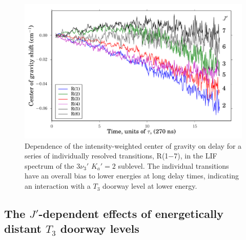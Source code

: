 \documentclass[12pt]{mitthesis}
\begin{document}
\begin{figure}
  \caption{Dependence of the intensity-weighted center of gravity on
    delay for a series of individually resolved transitions, R(1$-$7),
    in the LIF spectrum of the $3\nu_3'$ $K_a'\!=\!2$ sublevel.  The
    individual transitions have an overall bias to lower energies at
    long delay times, indicating an interaction with a $T_3$ doorway
    level at lower energy.}
  \label{fig:33k2-r123456-cog}
  \centering
  \includegraphics[width=6in]{33k2-r123456-cog-delay.pdf}
\end{figure}









\subsection{The $J'$-dependent effects of energetically distant $T_3$
  doorway levels}

\end{document}
